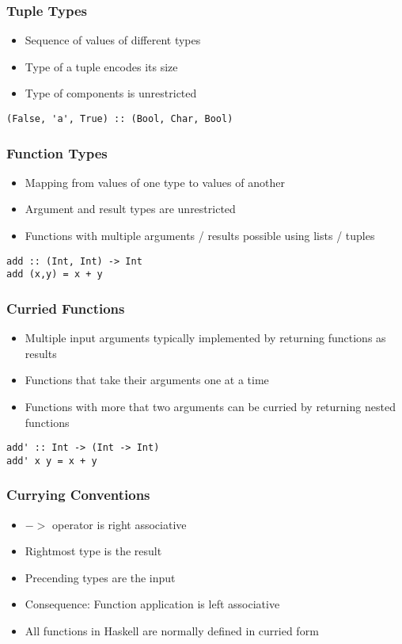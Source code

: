 \subsubsection{Tuple Types}
\begin{itemize}
    \item Sequence of values of different types
    \item Type of a tuple encodes its size
    \item Type of components is unrestricted
\end{itemize}
\begin{lstlisting}
(False, 'a', True) :: (Bool, Char, Bool)
\end{lstlisting}

\subsubsection{Function Types}
\begin{itemize}
    \item Mapping from values of one type to values of another
    \item Argument and result types are unrestricted
    \item Functions with multiple arguments / results possible using lists / tuples
\end{itemize}
\begin{lstlisting}
add :: (Int, Int) -> Int
add (x,y) = x + y
\end{lstlisting}

\subsubsection{Curried Functions}
\begin{itemize}
    \item Multiple input arguments typically implemented by returning functions as results
    \item Functions that take their arguments one at a time
    \item Functions with more that two arguments can be curried by returning nested functions
\end{itemize}
\begin{lstlisting}
add' :: Int -> (Int -> Int)
add' x y = x + y
\end{lstlisting}

\subsubsection{Currying Conventions}
\begin{itemize}
    \item $->$ operator is right associative
    \item Rightmost type is the result
    \item Precending types are the input
    \item Consequence: Function application is left associative
    \item All functions in Haskell are normally defined in curried form
\end{itemize}

